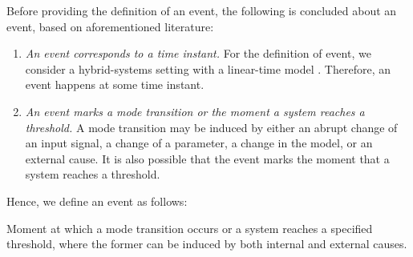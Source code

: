 Before providing the definition of an event, the following is concluded about an event, based on aforementioned literature:

\begin{enumerate}
	\item\textit{An event corresponds to a time instant.}
	\cstart For the definition of event, we consider a hybrid-systems setting with a linear-time model \autocite{alur1994theory}. Therefore, an event happens at some time instant.\cend
	
	\item\textit{An event marks a mode transition or the moment a system reaches a threshold.} A mode transition may be \cstart induced \cend by either an abrupt change of an input signal, a change of a parameter, a change in the model, \cstart or an external cause. \cend It is also possible that the event marks the moment that a system reaches a threshold.
	
\end{enumerate}

Hence, we define an event as follows:
\begin{definition}[Event] \label{def:event}
	\cstart Moment at which a mode transition occurs or a system reaches a specified threshold, where the former can be induced by both internal and external causes. \cend 
\end{definition}


